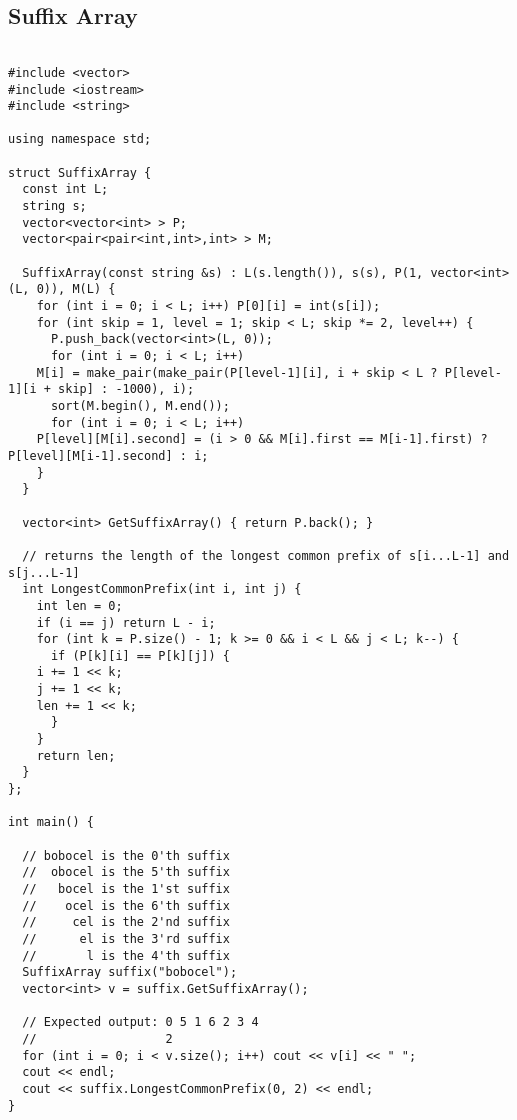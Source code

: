 \subsection{Suffix Array}
\begin{lstlisting}

#include <vector>
#include <iostream>
#include <string>

using namespace std;

struct SuffixArray {
  const int L;
  string s;
  vector<vector<int> > P;
  vector<pair<pair<int,int>,int> > M;

  SuffixArray(const string &s) : L(s.length()), s(s), P(1, vector<int>(L, 0)), M(L) {
    for (int i = 0; i < L; i++) P[0][i] = int(s[i]);
    for (int skip = 1, level = 1; skip < L; skip *= 2, level++) {
      P.push_back(vector<int>(L, 0));
      for (int i = 0; i < L; i++) 
	M[i] = make_pair(make_pair(P[level-1][i], i + skip < L ? P[level-1][i + skip] : -1000), i);
      sort(M.begin(), M.end());
      for (int i = 0; i < L; i++) 
	P[level][M[i].second] = (i > 0 && M[i].first == M[i-1].first) ? P[level][M[i-1].second] : i;
    }    
  }

  vector<int> GetSuffixArray() { return P.back(); }

  // returns the length of the longest common prefix of s[i...L-1] and s[j...L-1]
  int LongestCommonPrefix(int i, int j) {
    int len = 0;
    if (i == j) return L - i;
    for (int k = P.size() - 1; k >= 0 && i < L && j < L; k--) {
      if (P[k][i] == P[k][j]) {
	i += 1 << k;
	j += 1 << k;
	len += 1 << k;
      }
    }
    return len;
  }
};

int main() {

  // bobocel is the 0'th suffix
  //  obocel is the 5'th suffix
  //   bocel is the 1'st suffix
  //    ocel is the 6'th suffix
  //     cel is the 2'nd suffix
  //      el is the 3'rd suffix
  //       l is the 4'th suffix
  SuffixArray suffix("bobocel");
  vector<int> v = suffix.GetSuffixArray();
  
  // Expected output: 0 5 1 6 2 3 4
  //                  2
  for (int i = 0; i < v.size(); i++) cout << v[i] << " ";
  cout << endl;
  cout << suffix.LongestCommonPrefix(0, 2) << endl;
}

\end{lstlisting}
